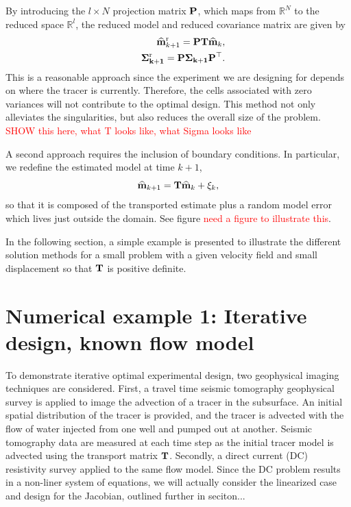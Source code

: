 \documentclass[12pt]{article}
\newcommand {\bfP}  { {\bf P} }
\newcommand{\alert}[1] {\textcolor{red}{#1}}
\newcommand{\bT}  {\text{\bf T}} %
\newcommand{\mhat}{\widehat{\bf m}}
\newcommand{\Sigh}{\bf \Sigma}
\begin{document}
By introducing the $l\times N$ projection matrix $\bfP$, which maps from  $\mathbb{R}^{N}$ to the reduced space $\mathbb{R}^{l}$,  the reduced model and reduced covariance matrix are given by
\begin{eqnarray}
&&\mhat^{\text{r}}_{k+1} =\bfP \bT \mhat_{k},\\
&&\Sigh^{\text{r}}_{k+1} = \bfP \Sigh_{k+1}\bfP^{\top}.
\end{eqnarray}
This is a reasonable approach since the experiment we are designing for depends on where the tracer is currently. Therefore, the cells associated with zero variances will not contribute to the optimal design. This method not only alleviates the singularities, but also reduces the overall size of the problem.  
\alert{SHOW this here, what T looks like, what Sigma looks like}

\bigskip
A second approach requires the inclusion of boundary conditions. In particular, we redefine the estimated model at time $k+1$, 
\begin{equation}
\mhat_{k+1} = \bT \mhat_{k} + \xi_k,
\end{equation}
so that it is composed of the transported estimate plus a random model error which lives just outside the domain. See figure \alert{need a figure to illustrate this}.

In the following section, a simple example is presented to illustrate the different solution methods for a small problem with a given velocity field and small displacement so that $\bT$ is positive definite. 


\section{Numerical example 1: Iterative design, known flow model} %
To demonstrate  iterative optimal experimental design, two geophysical imaging techniques are considered. First, a travel time seismic tomography geophysical survey is applied to image the advection of a tracer in the subsurface. An initial spatial distribution of the tracer is provided, and the tracer is advected with the flow of water injected from one well and pumped out at another. Seismic tomography data are measured at each time step as the initial tracer model is advected using the transport matrix $\bT$. 
Secondly, a direct current (DC) resistivity survey applied to the same flow model. Since the DC problem results in a non-liner system of equations, we will actually consider the linearized case and design for the Jacobian, outlined further in seciton...
\end{document}

